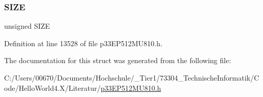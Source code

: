 \subsubsection{\texorpdfstring{S\+I\+ZE}{SIZE}}
{\footnotesize\ttfamily unsigned S\+I\+ZE}



Definition at line 13528 of file p33\+E\+P512\+M\+U810.\+h.



The documentation for this struct was generated from the following file\+:\begin{DoxyCompactItemize}
\item 
C\+:/\+Users/00670/\+Documents/\+Hochschule/\+\_\+\+Tier1/73304\+\_\+\+Technische\+Informatik/\+Code/\+Hello\+World4.\+X/\+Literatur/\hyperlink{p33_e_p512_m_u810_8h}{p33\+E\+P512\+M\+U810.\+h}\end{DoxyCompactItemize}
